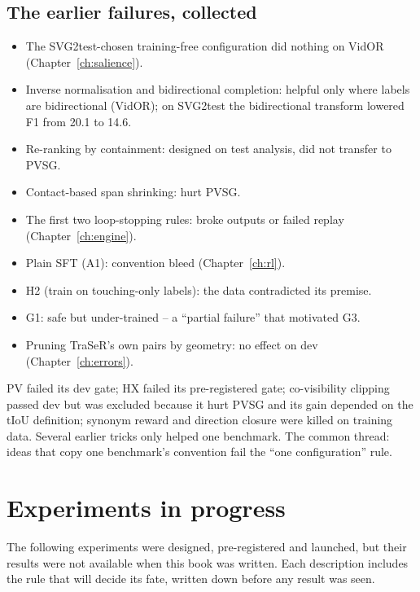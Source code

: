\documentclass[11pt,openany]{book}
\begin{document}
\section{The earlier failures, collected}
\begin{itemize}
  \item The SVG2test-chosen training-free configuration did nothing on VidOR (Chapter~\ref{ch:salience}).
  \item Inverse normalisation and bidirectional completion: helpful only where labels are bidirectional (VidOR); on SVG2test the
  bidirectional transform lowered F1 from 20.1 to 14.6.
  \item Re-ranking by containment: designed on test analysis, did not transfer to PVSG.
  \item Contact-based span shrinking: hurt PVSG.
  \item The first two loop-stopping rules: broke outputs or failed replay (Chapter~\ref{ch:engine}).
  \item Plain SFT (A1): convention bleed (Chapter~\ref{ch:rl}).
  \item H2 (train on touching-only labels): the data contradicted its premise.
  \item G1: safe but under-trained -- a ``partial failure'' that motivated G3.
  \item Pruning TraSeR's own pairs by geometry: no effect on dev (Chapter~\ref{ch:errors}).
\end{itemize}

\begin{summarybox}
PV failed its dev gate; HX failed its pre-registered gate; co-visibility clipping passed dev but was excluded because it hurt PVSG
and its gain depended on the tIoU definition; synonym reward and direction closure were killed on training data. Several earlier
tricks only helped one benchmark. The common thread: ideas that copy one benchmark's convention fail the ``one configuration'' rule.
\end{summarybox}

\chapter{Experiments in progress}\label{ch:pending}

The following experiments were designed, pre-registered and launched, but their results were not available when this book was
written. Each description includes the rule that will decide its fate, written down before any result was seen.
\end{document}

